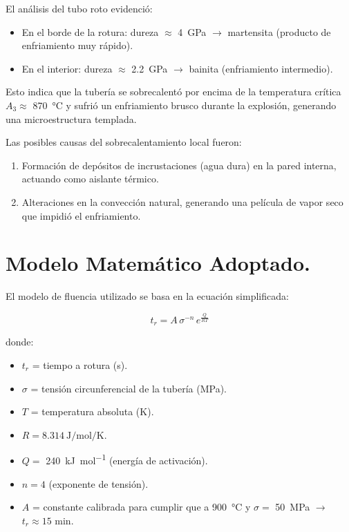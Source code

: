 \documentclass[12pt,a4paper]{article}
\begin{document}
El análisis del tubo roto evidenció:

\begin{itemize}
    \item En el borde de la rotura: dureza $\approx$ \SI{4}{\giga\pascal} $\rightarrow$ martensita (producto de enfriamiento muy rápido).
    \item En el interior: dureza $\approx$ \SI{2,2}{\giga\pascal} $\rightarrow$ bainita (enfriamiento intermedio).
\end{itemize}

Esto indica que la tubería se sobrecalentó por encima de la temperatura crítica $A_3 \approx$ \SI{870}{\celsius} y sufrió un enfriamiento brusco durante la explosión, generando una microestructura templada.

Las posibles causas del sobrecalentamiento local fueron:

\begin{enumerate}
    \item Formación de depósitos de incrustaciones (agua dura) en la pared interna, actuando como aislante térmico.
    \item Alteraciones en la convección natural, generando una película de vapor seco que impidió el enfriamiento.
\end{enumerate}

\section{Modelo Matemático Adoptado.}

El modelo de fluencia utilizado se basa en la ecuación simplificada:

\begin{equation}
    t_r = A \, \sigma^{-n} \, e^{\frac{Q}{R T}}
\end{equation}

donde:

\begin{itemize}
    \item $t_r$ = tiempo a rotura (\si{\second}).
    \item $\sigma$ = tensión circunferencial de la tubería (\si{\mega\pascal}).
    \item $T$ = temperatura absoluta (\si{\kelvin}).
    \item \(R = \SI[per-mode=symbol]{8,314}{\joule\per\mole\per\kelvin}\).
    \item $Q =$ \SI[per-mode=symbol]{240}{\kilo\joule\per\mole} (energía de activación).
    \item $n = 4$ (exponente de tensión).
    \item $A$ = constante calibrada para cumplir que a \SI{900}{\celsius} y $\sigma=$ \SI{50}{\mega\pascal} $\rightarrow$ $t_r \approx 15$ min.
\end{itemize}
\end{document}

